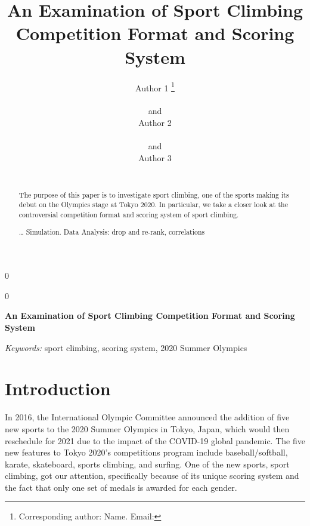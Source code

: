 \documentclass[12pt]{article}
\newcommand{\blind}{0}
\begin{document}
\def\spacingset#1{\renewcommand{\baselinestretch}%
{#1}\small\normalsize} \spacingset{1}



\blind
{
  \title{\bf An Examination of Sport Climbing Competition Format and
Scoring System}

  \author{
        Author 1 \thanks{Corresponding author: Name. Email:} \\
    \\
     and \\     Author 2 \\
    \\
     and \\     Author 3 \\
    \\
      }
  \maketitle
} \fi

\blind
{
  \bigskip
  \bigskip
  \bigskip
  \begin{center}
    {\LARGE\bf An Examination of Sport Climbing Competition Format and
Scoring System}
  \end{center}
  \medskip
} \fi

\bigskip
\begin{abstract}
The purpose of this paper is to investigate sport climbing, one of the
sports making its debut on the Olympics stage at Tokyo 2020. In
particular, we take a closer look at the controversial competition
format and scoring system of sport climbing.

\ldots{} Simulation. Data Analysis: drop and re-rank, correlations
\end{abstract}

\noindent%
{\it Keywords:} sport climbing, scoring system, 2020 Summer Olympics
\vfill

\newpage
\spacingset{1.45} %

\hypertarget{introduction}{%
\section{Introduction}\label{introduction}}

In 2016, the International Olympic Committee announced the addition of
five new sports to the 2020 Summer Olympics in Tokyo, Japan, which would
then reschedule for 2021 due to the impact of the COVID-19 global
pandemic. The five new features to Tokyo 2020's competitions program
include baseball/softball, karate, skateboard, sports climbing, and
surfing. One of the new sports, sport climbing, got our attention,
specifically because of its unique scoring system and the fact that only
one set of medals is awarded for each gender.
\end{document}
